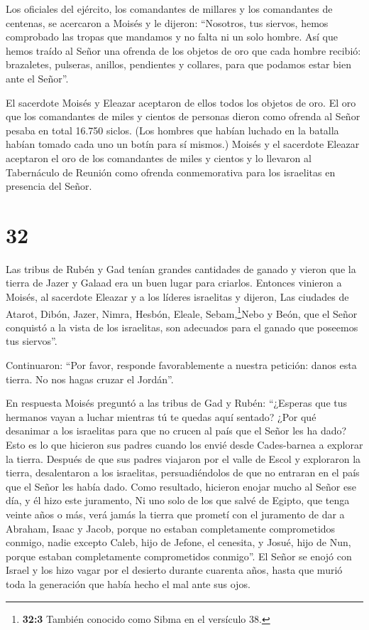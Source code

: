  Los oficiales del ejército, los comandantes de millares y
los comandantes de centenas, se acercaron a Moisés  y le
dijeron: ``Nosotros, tus siervos, hemos comprobado las tropas que
mandamos y no falta ni un solo hombre.  Así que hemos
traído al Señor una ofrenda de los objetos de oro que cada hombre
recibió: brazaletes, pulseras, anillos, pendientes y collares, para que
podamos estar bien ante el Señor''.

 El sacerdote Moisés y Eleazar aceptaron de ellos todos los
objetos de oro.  El oro que los comandantes de miles y
cientos de personas dieron como ofrenda al Señor pesaba en total 16.750
siclos.  (Los hombres que habían luchado en la batalla
habían tomado cada uno un botín para sí mismos.)  Moisés y
el sacerdote Eleazar aceptaron el oro de los comandantes de miles y
cientos y lo llevaron al Tabernáculo de Reunión como ofrenda
conmemorativa para los israelitas en presencia del Señor.

\hypertarget{section-31}{%
\section{32}\label{section-31}}

 Las tribus de Rubén y Gad tenían grandes cantidades de
ganado y vieron que la tierra de Jazer y Galaad era un buen lugar para
criarlos.  Entonces vinieron a Moisés, al sacerdote Eleazar
y a los líderes israelitas y dijeron,  Las ciudades de
Atarot, Dibón, Jazer, Nimra, Hesbón, Eleale, Sebam,\footnote{\textbf{32:3}
  También conocido como Sibma en el versículo 38.}Nebo y Beón,
 que el Señor conquistó a la vista de los israelitas, son
adecuados para el ganado que poseemos tus siervos''.

 Continuaron: ``Por favor, responde favorablemente a nuestra
petición: danos esta tierra. No nos hagas cruzar el Jordán''.

 En respuesta Moisés preguntó a las tribus de Gad y Rubén:
``¿Esperas que tus hermanos vayan a luchar mientras tú te quedas aquí
sentado?  ¿Por qué desanimar a los israelitas para que no
crucen al país que el Señor les ha dado?  Esto es lo que
hicieron sus padres cuando los envié desde Cades-barnea a explorar la
tierra.  Después de que sus padres viajaron por el valle de
Escol y exploraron la tierra, desalentaron a los israelitas,
persuadiéndolos de que no entraran en el país que el Señor les había
dado.  Como resultado, hicieron enojar mucho al Señor ese
día, y él hizo este juramento,  Ni uno solo de los que
salvé de Egipto, que tenga veinte años o más, verá jamás la tierra que
prometí con el juramento de dar a Abraham, Isaac y Jacob, porque no
estaban completamente comprometidos conmigo,  nadie excepto
Caleb, hijo de Jefone, el cenesita, y Josué, hijo de Nun, porque estaban
completamente comprometidos conmigo''.  El Señor se enojó
con Israel y los hizo vagar por el desierto durante cuarenta años, hasta
que murió toda la generación que había hecho el mal ante sus ojos.

